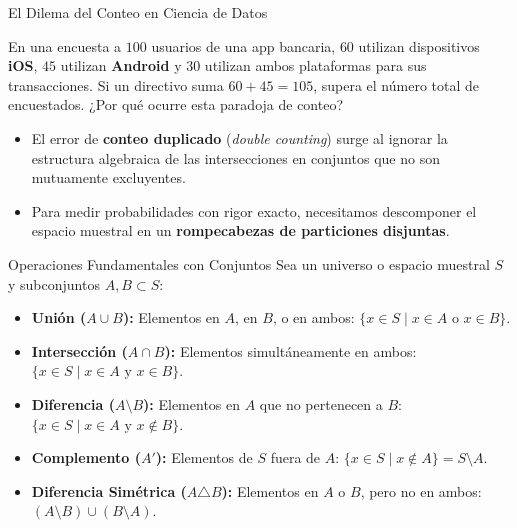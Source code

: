 \begin{frame}{El Dilema del Conteo en Ciencia de Datos}
  \begin{motivacion}
    En una encuesta a $100$ usuarios de una app bancaria, $60$ utilizan dispositivos \textbf{iOS}, $45$ utilizan \textbf{Android} y $30$ utilizan ambos plataformas para sus transacciones. Si un directivo suma $60 + 45 = 105$, supera el número total de encuestados. ¿Por qué ocurre esta paradoja de conteo?
  \end{motivacion}
  
  \vspace{0.4em}
  \pause
  \begin{itemize}
    \item El error de \textbf{conteo duplicado} (\emph{double counting}) surge al ignorar la estructura algebraica de las intersecciones en conjuntos que no son mutuamente excluyentes. \pause
    \item Para medir probabilidades con rigor exacto, necesitamos descomponer el espacio muestral en un \textbf{rompecabezas de particiones disjuntas}.
  \end{itemize}
\end{frame}

\begin{frame}{Operaciones Fundamentales con Conjuntos}
  Sea un universo o espacio muestral $S$ y subconjuntos $A, B \subset S$:
  
  \vspace{0.2em}
  \begin{itemize}
    \item \textbf{Unión ($A \cup B$):} Elementos en $A$, en $B$, o en ambos: $\{x \in S \mid x \in A \text{ o } x \in B\}$. \pause
    \item \textbf{Intersección ($A \cap B$):} Elementos simultáneamente en ambos: $\{x \in S \mid x \in A \text{ y } x \in B\}$. \pause
    \item \textbf{Diferencia ($A \setminus B$):} Elementos en $A$ que no pertenecen a $B$: $\{x \in S \mid x \in A \text{ y } x \notin B\}$. \pause
    \item \textbf{Complemento ($A'$):} Elementos de $S$ fuera de $A$: $\{x \in S \mid x \notin A\} = S \setminus A$. \pause
    \item \textbf{Diferencia Simétrica ($A \triangle B$):} Elementos en $A$ o $B$, pero no en ambos: $(A \setminus B) \cup (B \setminus A)$.
  \end{itemize}
\end{frame}

